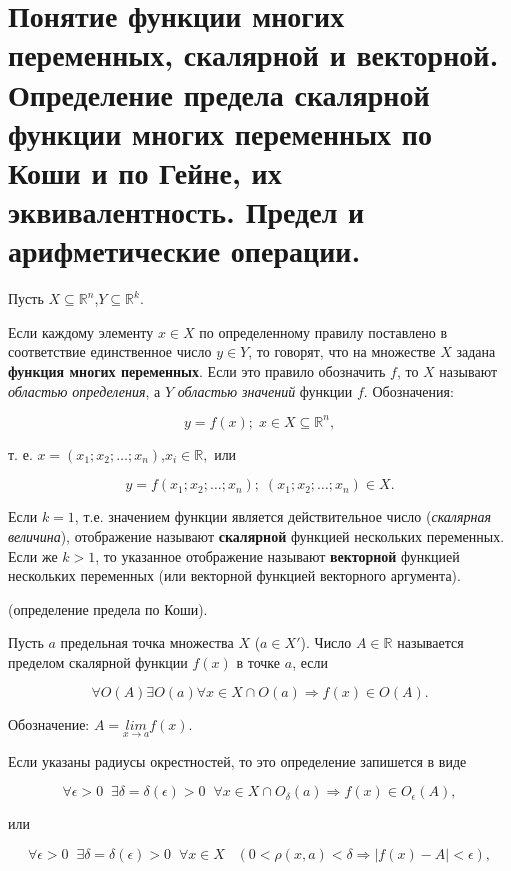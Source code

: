 \section{Понятие функции многих переменных, скалярной и векторной. Определение предела скалярной функции многих переменных по Коши и по Гейне, их эквивалентность. Предел и арифметические операции.}

Пусть $X\subseteq\mathbb{R}^n$,$Y\subseteq\mathbb{R}^k$.
    
Если каждому элементу $x \in X$ по определенному правилу поставлено в соответствие единственное число $y \in Y$,
то говорят, что на множестве $X$ задана \textbf{функция многих
переменных}. Если это правило обозначить $f$, то $X$ называют \textit{областью определения}, 
а $Y$  \textit{областью значений} функции $f$. Обозначения:

$$y=f(x);\;x\in{X}\subseteq\mathbb{R}^n,$$

т. е. $x=(x_1; x_2;\ldots;x_n)$,$x_i\in\mathbb{R},$ или

$$y=f(x_1;x_2;\ldots;x_n);\;(x_1;x_2;\ldots;x_n)\in{X}.$$

Если $k=1$, т.е. значением функции является действительное число (\textit{скалярная величина}), отображение называют
\textbf{скалярной} функцией нескольких переменных. Если же $k>1$, то указанное отображение
называют \textbf{векторной} функцией нескольких переменных (или векторной функцией
векторного аргумента).

\;

\begin{definition}
    (определение предела по Коши).
    
    Пусть $a$ предельная точка множества $X$ ($a \in X'$). Число
    $A \in \mathbb{R}$ называется пределом скалярной функции $f(x)$ в точке $a$, если
\end{definition}

$$\forall O(A) \exists O(a) \forall x \in X \cap O (a) \Rightarrow f(x) \in O(A).$$

Обозначение: $A = \underset{x \rightarrow a} {lim} f(x)$.

Если указаны радиусы окрестностей, то это определение запишется в виде

$$\forall \epsilon > 0 \;\; \exists \delta = \delta(\epsilon) > 0 \;\; \forall x \in X \cap O_{\delta}(a) \Rightarrow f(x) \in O_{\epsilon}(A),$$

или

$$\forall \epsilon > 0 \;\; \exists \delta = \delta (\epsilon) > 0 \;\; \forall x \in X \;\;\;
(0 < \rho (x,a) < \delta \Rightarrow \vert f(x) - A \vert < \epsilon),$$

